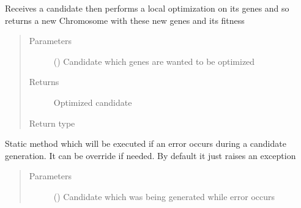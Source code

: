 \documentclass[letterpaper,10pt,english]{sphinxmanual}
\begin{document}
\begin{fulllineitems}
\begin{fulllineitems}
\label{\detokenize{MolOpt.genetic:MolOpt.genetic.genetic.Genetic.__local_optimization}}
\sphinxAtStartPar
Receives a candidate then performs a local optimization on its genes and so returns a new Chromosome with
these new genes and its fitness
\begin{quote}\begin{description}
\item[{Parameters}] \leavevmode
\sphinxAtStartPar
{} ({\hyperref[\detokenize{MolOpt.genetic:MolOpt.genetic.genetic.Chromosome}]{}}) \textendash{} Candidate which genes are wanted to be optimized

\item[{Returns}] \leavevmode
\sphinxAtStartPar
Optimized candidate

\item[{Return type}] \leavevmode
\sphinxAtStartPar
{\hyperref[\detokenize{MolOpt.genetic:MolOpt.genetic.genetic.Chromosome}]{}}

\end{description}\end{quote}

\end{fulllineitems}


\begin{fulllineitems}
\label{\detokenize{MolOpt.genetic:MolOpt.genetic.genetic.Genetic.catch}}
\sphinxAtStartPar
Static method which will be executed if an error occurs during a candidate generation. It can be override if 
needed. By default it just raises an exception
\begin{quote}\begin{description}
\item[{Parameters}] \leavevmode
\sphinxAtStartPar
{} ({\hyperref[\detokenize{MolOpt.genetic:MolOpt.genetic.genetic.Chromosome}]{}}) \textendash{} Candidate which was being generated while error occurs


\end{description}
\end{quote}
\end{fulllineitems}
\end{fulllineitems}
\end{document}
